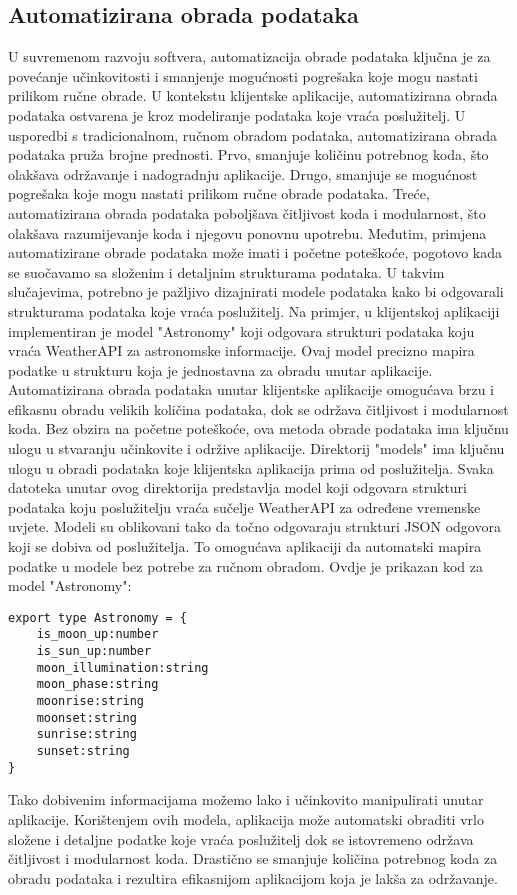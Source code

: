 \documentclass[times, utf8, zavrsni]{fer}
\begin{document}
\subsection{Automatizirana obrada podataka}
U suvremenom razvoju softvera, automatizacija obrade podataka ključna je za povećanje učinkovitosti i smanjenje mogućnosti pogrešaka koje mogu nastati prilikom ručne obrade. U kontekstu klijentske aplikacije, automatizirana obrada podataka ostvarena je kroz modeliranje podataka koje vraća poslužitelj. U usporedbi s tradicionalnom, ručnom obradom podataka, automatizirana obrada podataka pruža brojne prednosti. Prvo, smanjuje količinu potrebnog koda, što olakšava održavanje i nadogradnju aplikacije. Drugo, smanjuje se mogućnost pogrešaka koje mogu nastati prilikom ručne obrade podataka. Treće, automatizirana obrada podataka poboljšava čitljivost koda i modularnost, što olakšava razumijevanje koda i njegovu ponovnu upotrebu. Međutim, primjena automatizirane obrade podataka može imati i početne poteškoće, pogotovo kada se suočavamo sa složenim i detaljnim strukturama podataka. U takvim slučajevima, potrebno je pažljivo dizajnirati modele podataka kako bi odgovarali strukturama podataka koje vraća poslužitelj. Na primjer, u klijentskoj aplikaciji implementiran je model "Astronomy" koji odgovara strukturi podataka koju vraća WeatherAPI za astronomske informacije. Ovaj model precizno mapira podatke u strukturu koja je jednostavna za obradu unutar aplikacije. Automatizirana obrada podataka unutar klijentske aplikacije omogućava brzu i efikasnu obradu velikih količina podataka, dok se održava čitljivost i modularnost koda. Bez obzira na početne poteškoće, ova metoda obrade podataka ima ključnu ulogu u stvaranju učinkovite i održive aplikacije. Direktorij "models" ima ključnu ulogu u obradi podataka koje klijentska aplikacija prima od poslužitelja. Svaka datoteka unutar ovog direktorija predstavlja model koji odgovara strukturi podataka koju poslužitelju vraća sučelje WeatherAPI za određene vremenske uvjete. Modeli su oblikovani tako da točno odgovaraju strukturi JSON odgovora koji se dobiva od poslužitelja. To omogućava aplikaciji da automatski mapira podatke u modele bez potrebe za ručnom obradom. Ovdje je prikazan kod za model "Astronomy":

\begin{verbatim}
export type Astronomy = {
    is_moon_up:number
    is_sun_up:number
    moon_illumination:string
    moon_phase:string
    moonrise:string
    moonset:string
    sunrise:string
    sunset:string
}
\end{verbatim}
Tako dobivenim informacijama možemo lako i učinkovito manipulirati unutar aplikacije. Korištenjem ovih modela, aplikacija može automatski obraditi vrlo složene i detaljne podatke koje vraća poslužitelj dok se istovremeno održava čitljivost i modularnost koda. Drastično se smanjuje količina potrebnog koda za obradu podataka i rezultira efikasnijom aplikacijom koja je lakša za održavanje.
\end{document}
